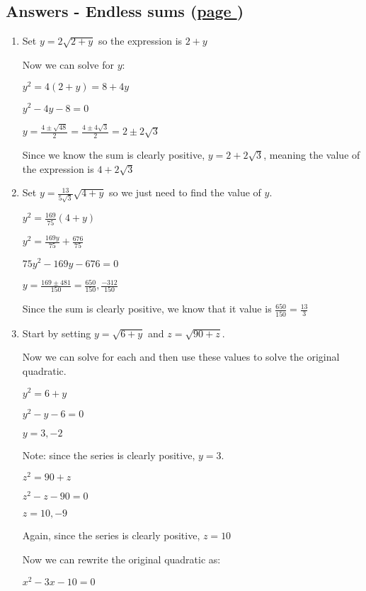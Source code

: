 \documentclass[../main.tex]{subfiles}
\begin{document}
\hypertarget{endlesssumsanswers}{\subsection*{Answers - Endless sums (\hyperlink{endlesssumslink}{page \pageref{Endless sums}})}}

\label{Endless sums answers}
\begin{enumerate}[itemsep=1cm]
    \item 
    Set $y=2\sqrt{2+y}$ so the expression is $2+y$

    Now we can solve for $y$:

    $y^2=4(2+y)=8+4y$

    $y^2-4y-8=0$

    $y=\frac{4 \pm \sqrt{48}}{2}=\frac{4\pm 4\sqrt{3}}{2}=2\pm 2\sqrt{3}$

    Since we know the sum is clearly positive, $y=2+2\sqrt{3}$, meaning the value of the expression is $4+2\sqrt{3}$

    \item 
    Set $y=\frac{13}{5\sqrt{3}}\sqrt{4+y}$ so we just need to find the value of $y$.

    $y^2=\frac{169}{75}(4+y)$

    $y^2=\frac{169y}{75}+\frac{676}{75}$

    $75y^2-169y-676=0$

    $y=\frac{169\pm 481}{150}=\frac{650}{150}, \frac{-312}{150}$

    Since the sum is clearly positive, we know that it value is $\frac{650}{150}=\frac{13}{3}$
    
    \item
    Start by setting $y=\sqrt{6+y}$ and $z=\sqrt{90+z}$.

    Now we can solve for each and then use these values to solve the original quadratic.

    $y^2=6+y$

    $y^2-y-6=0$

    $y=3, -2$

    Note: since the series is clearly positive, $y=3$.

    $z^2=90+z$

    $z^2-z-90=0$

    $z=10, -9$

    Again, since the series is clearly positive, $z=10$

    Now we can rewrite the original quadratic as:

    $x^2-3x-10=0$


\end{enumerate}
\end{document}
